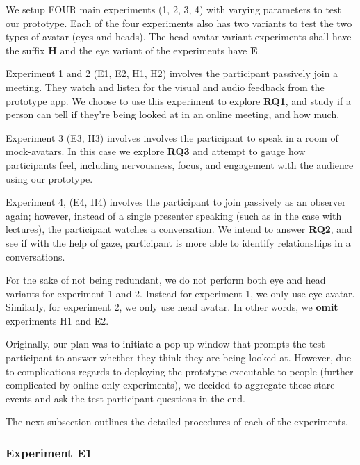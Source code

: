 We setup FOUR main experiments (1, 2, 3, 4) with varying parameters to test our prototype. Each of the four experiments also has two variants to test the two types of avatar (eyes and heads). The head avatar variant experiments shall have the suffix \textbf{H} and the eye variant of the experiments have \textbf{E}.

Experiment 1 and 2 (E1, E2, H1, H2) involves the participant passively join a meeting. They watch and listen for the visual and audio feedback from the prototype app. We choose to use this experiment to explore \textbf{RQ1}, and study if a person can tell if they're being looked at in an online meeting, and how much.

Experiment 3 (E3, H3) involves involves the participant to speak in a room of mock-avatars. In this case we explore \textbf{RQ3} and attempt to gauge how participants feel, including nervousness, focus, and engagement with the audience using our prototype.

Experiment 4, (E4, H4) involves the participant to join passively as an observer again; 
however, instead of a single presenter speaking (such as in the case with lectures),
the participant watches a conversation. We intend to answer \textbf{RQ2}, and see if with the help
of gaze, participant is more able to identify relationships in a conversations.

For the sake of not being redundant, we do not perform both eye and head variants for experiment 1 and 2. Instead for experiment 1, we only use eye avatar. Similarly, for experiment 2, we only use head avatar. In other words, we \textbf{omit} experiments H1 and E2.

Originally, our plan was to initiate a pop-up window that prompts the test participant to answer whether they think they are being looked at. However, due to complications regards to deploying the prototype executable to people (further complicated by online-only experiments), we decided to aggregate these stare events and ask the test participant questions in the end.

The next subsection outlines the detailed procedures of each of the experiments.

\subsubsection{Experiment E1}

